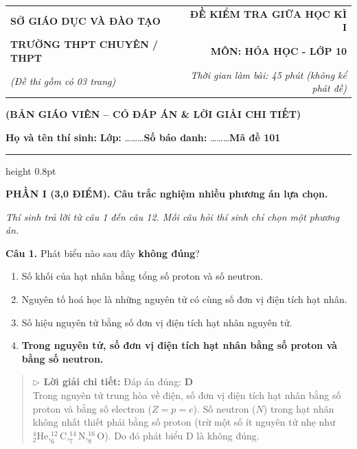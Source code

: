 \documentclass[11pt,a4paper]{article}
\begin{document}
\begin{tabularx}{\textwidth}{@{}l X r@{}}
\textbf{\small SỞ GIÁO DỤC VÀ ĐÀO TẠO} & & \textbf{\small ĐỀ KIỂM TRA GIỮA HỌC KÌ I} \\
\textbf{\normalsize TRƯỜNG THPT CHUYÊN / THPT} & & \textbf{\normalsize MÔN: HÓA HỌC - LỚP 10} \\
\textit{\small (Đề thi gồm có 03 trang)} & & \textit{\small Thời gian làm bài: 45 phút (không kể phát đề)}
\end{tabularx}

\begin{center}
{\color{red!80!black}\textbf{(BẢN GIÁO VIÊN -- CÓ ĐÁP ÁN \& LỜI GIẢI CHI TIẾT)}}\par\vspace{3pt}
\textbf{Họ và tên thí sinh:} \dotfill \quad \textbf{Lớp:} \dots\dots\dots \quad \textbf{Số báo danh:} \dots\dots\dots \hfill \textbf{\large Mã đề 101}
\end{center}
\vspace{-4pt}
{\color{gray!50}\hrule height 0.8pt}
\vspace{6pt}

{\color{myGreen}\bfseries\large PHẦN I (3,0 ĐIỂM). Câu trắc nghiệm nhiều phương án lựa chọn.}

\textit{\small Thí sinh trả lời từ câu 1 đến câu 12. Mỗi câu hỏi thí sinh chỉ chọn một phương án.}
\vspace{3pt}

\textbf{Câu 1.} Phát biểu nào sau đây \textbf{không đúng}?
\begin{enumerate}[label=\textbf{\Alph*.},leftmargin=*,itemsep=1pt,topsep=1pt]
\item Số khối của hạt nhân bằng tổng số proton và số neutron.
\item Nguyên tố hoá học là những nguyên tử có cùng số đơn vị điện tích hạt nhân.
\item Số hiệu nguyên tử bằng số đơn vị điện tích hạt nhân nguyên tử.
\item \textbf{\color{red} Trong nguyên tử, số đơn vị điện tích hạt nhân bằng số proton và bằng số neutron.}
\end{enumerate}
\begin{quote}\small
{\color{myBlue}\textbf{$\triangleright$ Lời giải chi tiết:}} Đáp án đúng: \textbf{\color{red} D}\\
Trong nguyên tử trung hòa về điện, số đơn vị điện tích hạt nhân bằng số proton và bằng số electron ($Z = p = e$). Số neutron ($N$) trong hạt nhân không nhất thiết phải bằng số proton (trừ một số ít nguyên tử nhẹ như $^4_2\text{He}, ^{12}_6\text{C}, ^{14}_7\text{N}, ^{16}_8\text{O}$). Do đó phát biểu D là không đúng.
\end{quote}
\vspace{2pt}
\end{document}
